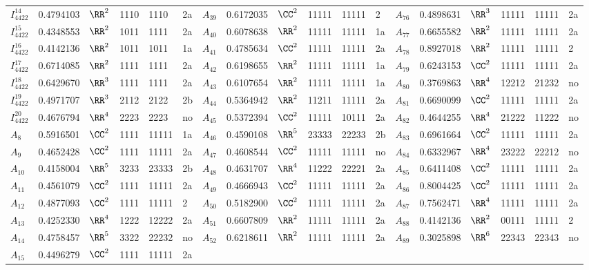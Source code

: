 \begin{table}[tbm]
\begin{tabular}{l l l l l l l l l l l l l l l l l l}
 $I^{14}_{4422}$&0.4794103&$\RR^2$&1110&1110&2a&\hphantom{v}$A_{39}$&0.6172035&$\CC^2$&11111&11111&2&\hphantom{v}$A_{76}$&0.4898631&$\RR^3$&11111&11111&2a\\
 $I^{15}_{4422}$&0.4348553&$\RR^2$&1011&1111&2a&\hphantom{v}$A_{40}$&0.6078638&$\RR^2$&11111&11111&1a&\hphantom{v}$A_{77}$&0.6655582&$\RR^2$&11111&11111&2a\\
 $I^{16}_{4422}$&0.4142136&$\RR^2$&1011&1011&1a&\hphantom{v}$A_{41}$&0.4785634&$\CC^2$&11111&11111&2a&\hphantom{v}$A_{78}$&0.8927018&$\RR^2$&11111&11111&2\\
 $I^{17}_{4422}$&0.6714085&$\RR^2$&1111&1111&2a&\hphantom{v}$A_{42}$&0.6198655&$\RR^2$&11111&11111&1a&\hphantom{v}$A_{79}$&0.6243153&$\CC^2$&11111&11111&2a\\
 $I^{18}_{4422}$&0.6429670&$\RR^3$&1111&1111&2a&\hphantom{v}$A_{43}$&0.6107654&$\RR^2$&11111&11111&1a&\hphantom{v}$A_{80}$&0.3769863&$\RR^4$&12212&21232&no\\
 $I^{19}_{4422}$&0.4971707&$\RR^3$&2112&2122&2b&\hphantom{v}$A_{44}$&0.5364942&$\RR^2$&11211&11111&2a&\hphantom{v}$A_{81}$&0.6690099&$\CC^2$&11111&11111&2a\\
 $I^{20}_{4422}$&0.4676794&$\RR^4$&2223&2223&no&\hphantom{v}$A_{45}$&0.5372394&$\CC^2$&11111&10111&2a&\hphantom{v}$A_{82}$&0.4644255&$\RR^4$&21222&11222&no\\
 $A_8$&0.5916501&$\CC^2$&1111&11111&1a&\hphantom{v}$A_{46}$&0.4590108&$\RR^5$&23333&22233&2b&\hphantom{v}$A_{83}$&0.6961664&$\CC^2$&11111&11111&2a\\
 $A_9$&0.4652428&$\CC^2$&1111&11111&2a&\hphantom{v}$A_{47}$&0.4608544&$\CC^2$&11111&11111&no&\hphantom{v}$A_{84}$&0.6332967&$\RR^4$&23222&22212&no\\
 $A_{10}$&0.4158004&$\RR^5$&3233&23333&2b&\hphantom{v}$A_{48}$&0.4631707&$\RR^4$&11222&22221&2a&\hphantom{v}$A_{85}$&0.6411408&$\CC^2$&11111&11111&2a\\
 $A_{11}$&0.4561079&$\CC^2$&1111&11111&2a&\hphantom{v}$A_{49}$&0.4666943&$\CC^2$&11111&11111&2a&\hphantom{v}$A_{86}$&0.8004425&$\CC^2$&11111&11111&2a\\
 $A_{12}$&0.4877093&$\CC^2$&1111&11111&2&\hphantom{v}$A_{50}$&0.5182900&$\CC^2$&11111&11111&2a&\hphantom{v}$A_{87}$&0.7562471&$\RR^4$&11111&11111&2a\\
 $A_{13}$&0.4252330&$\RR^4$&1222&12222&2a&\hphantom{v}$A_{51}$&0.6607809&$\RR^2$&11111&11111&2a&\hphantom{v}$A_{88}$&0.4142136&$\RR^2$&00111&11111&2\\
 $A_{14}$&0.4758457&$\RR^5$&3322&22232&no&\hphantom{v}$A_{52}$&0.6218611&$\RR^2$&11111&11111&2a&\hphantom{v}$A_{89}$&0.3025898&$\RR^6$&22343&22343&no\\
 $A_{15}$&0.4496279&$\CC^2$&1111&11111&2a\\
 \hline
 \end{tabular}
 \label{table:b5}
 \end{table}

